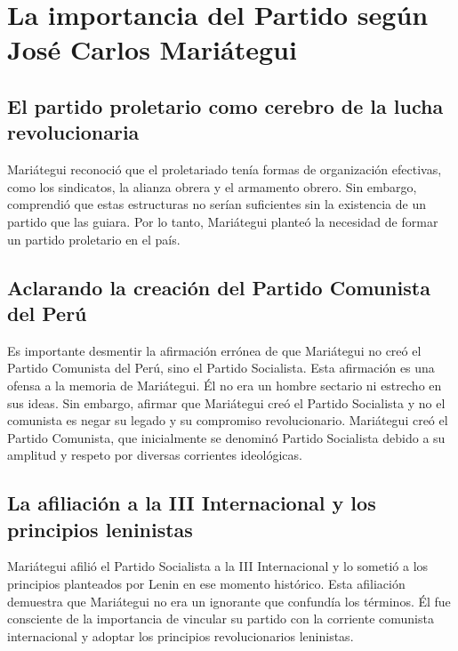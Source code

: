 \documentclass[
  jou,
  floatsintext,
  longtable,
  a4paper,
  nolmodern,
  notxfonts,
  notimes,
  12pt,
  colorlinks=true,linkcolor=blue,citecolor=blue,urlcolor=blue]{apa7}
\begin{document}
\section{La importancia del Partido según José Carlos
Mariátegui}\label{la-importancia-del-partido-seguxfan-josuxe9-carlos-mariuxe1tegui}

\subsection{El partido proletario como cerebro de la lucha
revolucionaria}\label{el-partido-proletario-como-cerebro-de-la-lucha-revolucionaria}

Mariátegui reconoció que el proletariado tenía formas de organización
efectivas, como los sindicatos, la alianza obrera y el armamento obrero.
Sin embargo, comprendió que estas estructuras no serían suficientes sin
la existencia de un partido que las guiara. Por lo tanto, Mariátegui
planteó la necesidad de formar un partido proletario en el país.

\subsection{Aclarando la creación del Partido Comunista del
Perú}\label{aclarando-la-creaciuxf3n-del-partido-comunista-del-peruxfa}

Es importante desmentir la afirmación errónea de que Mariátegui no creó
el Partido Comunista del Perú, sino el Partido Socialista. Esta
afirmación es una ofensa a la memoria de Mariátegui. Él no era un hombre
sectario ni estrecho en sus ideas. Sin embargo, afirmar que Mariátegui
creó el Partido Socialista y no el comunista es negar su legado y su
compromiso revolucionario. Mariátegui creó el Partido Comunista, que
inicialmente se denominó Partido Socialista debido a su amplitud y
respeto por diversas corrientes ideológicas.

\subsection{La afiliación a la III Internacional y los principios
leninistas}\label{la-afiliaciuxf3n-a-la-iii-internacional-y-los-principios-leninistas}

Mariátegui afilió el Partido Socialista a la III Internacional y lo
sometió a los principios planteados por Lenin en ese momento histórico.
Esta afiliación demuestra que Mariátegui no era un ignorante que
confundía los términos. Él fue consciente de la importancia de vincular
su partido con la corriente comunista internacional y adoptar los
principios revolucionarios leninistas.
\end{document}
